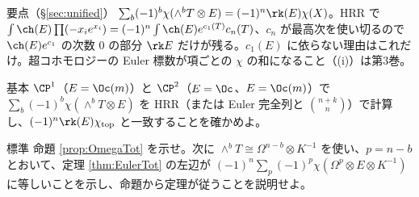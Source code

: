 \begin{keybox}{要点（\S\ref{sec:unified}）}
$\sum_b(-1)^b\chi(\wedge^bT\otimes E)=(-1)^n\rk(E)\chi(X)$。HRR で $\int\ch(E)\prod(-x_ie^{x_i})=(-1)^n\int\ch(E)e^{c_1(T)}c_n(T)$、$c_n$ が最高次を使い切るので $\ch(E)e^{c_1}$ の次数 $0$ の部分 $\rk E$ だけが残る。$c_1(E)$ に依らない理由はこれだけ。超コホモロジーの Euler 標数が項ごとの $\chi$ の和になること（(i)）は第3巻。
\end{keybox}
\begin{prob}{基本}\label{p:EulerP12}
$\CP^1$（$E=\Oc(m)$）と $\CP^2$（$E=\Oc$、$E=\Oc(m)$）で $\sum_b(-1)^b\chi(\wedge^bT\otimes E)$ を HRR（または Euler 完全列と $\binom{n+k}n$）で計算し、$(-1)^n\rk(E)\chi_{\rm top}$ と一致することを確かめよ。
\end{prob}
\begin{prob}{標準}\label{p:OmegaTot}
命題 \ref{prop:OmegaTot} を示せ。次に $\wedge^bT\cong\Omega^{n-b}\otimes K^{-1}$ を使い、$p=n-b$ とおいて、定理 \ref{thm:EulerTot} の左辺が $(-1)^n\sum_p(-1)^p\chi(\Omega^p\otimes E\otimes K^{-1})$ に等しいことを示し、命題から定理が従うことを説明せよ。
\end{prob}
